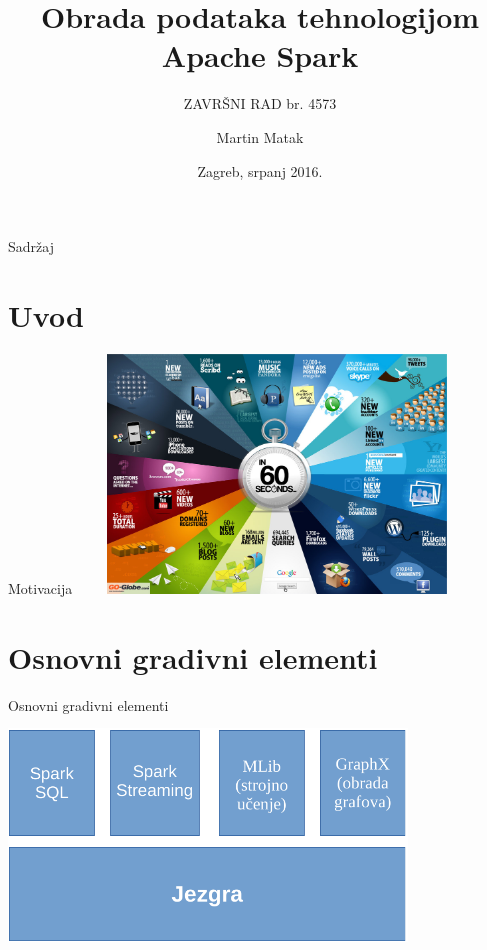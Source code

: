 \documentclass{beamer}
\title{Obrada podataka tehnologijom Apache Spark}
\subtitle{ZAVRŠNI RAD br. 4573}
\author{Martin Matak}
\institute[UNIZG, FER] %
{ 
  Mentor: doc. dr. sc. Marko Čupić \\
  Fakultet elektrotehnike i računarstva\\
  Sveučilište u Zagrebu 
}
\date{Zagreb, srpanj 2016.}
\begin{document}
\begin{frame}
  \titlepage
\end{frame}

\begin{frame}{Sadržaj}
  \tableofcontents
\end{frame}

\section{Uvod}
\begin{frame}{Motivacija}
	\includegraphics[width=300pt, height=180pt]{60seconds.jpg}%
\end{frame}

\section{Osnovni gradivni elementi}

\begin{frame}{Osnovni gradivni elementi}
	\includegraphics[width=300pt, height=180pt]{gradivniElementiCropped.pdf}%
\end{frame}
\end{document}
